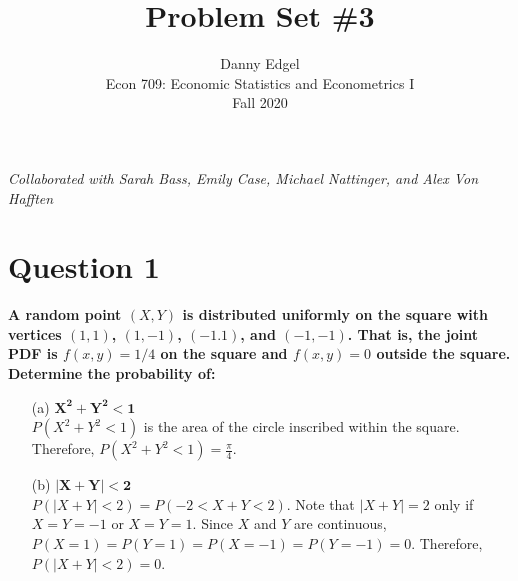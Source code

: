 \documentclass{article}
\begin{document}
\title{	Problem Set \#3 }
\author{ 	Danny Edgel 										\\ 
			Econ 709: Economic Statistics and Econometrics I	\\
			Fall 2020											\\
		}
\maketitle\thispagestyle{empty}


\noindent\textit{Collaborated with Sarah Bass, Emily Case, Michael Nattinger, and Alex Von Hafften}

\section*{Question 1}
\textbf{A random point $(X,Y)$ is distributed uniformly on the square with vertices $(1,1)$, $(1,-1)$, $(-1.1)$, and $(-1,-1)$. That is, the joint PDF is $f(x,y)=1/4$ on the square and $f(x,y)=0$ outside the square. Determine the probability of:}
\begin{itemize}
	\item[(a)] $\mathbf{X^2 + Y^2 < 1}$
	\bigskip \\
	$P(X^2+Y^2<1)$ is the area of the circle inscribed within the square. Therefore, $P(X^2+Y^2<1)=\frac{\pi}{4}$.

	\item[(b)] $\mathbf{|X + Y| < 2}$
	\bigskip \\
	$P(|X + Y| < 2) = P(-2<X+Y<2)$. Note that $|X + Y| = 2$ only if $X=Y=-1$ or $X=Y=1$. Since $X$ and $Y$ are continuous, $P(X=1)=P(Y=1)=P(X=-1)=P(Y=-1)=0$. Therefore, $P(|X + Y| < 2)=0$.
	
\end{itemize}


\end{document}
